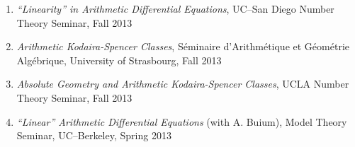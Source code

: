 \documentclass[a4paper,10pt]{article}
\begin{document}
\begin{enumerate}
	\item \emph{``Linearity'' in Arithmetic Differential Equations}, UC--San Diego Number Theory Seminar, Fall 2013
	\item \emph{Arithmetic Kodaira-Spencer Classes}, S\'eminaire d'Arithm\'etique et G\'eom\'etrie Alg\'ebrique, University of Strasbourg, Fall 2013
	\item \emph{Absolute Geometry and Arithmetic Kodaira-Spencer Classes}, UCLA Number Theory Seminar, Fall 2013
	\item \emph{``Linear'' Arithmetic Differential Equations} (with A. Buium), Model Theory Seminar, UC--Berkeley, Spring 2013
\end{enumerate}
\end{document}
